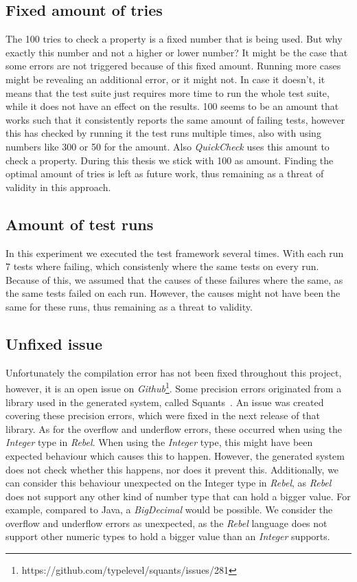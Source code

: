\subsection*{Fixed amount of tries}
The 100 tries to check a property is a fixed number that is being used. But why exactly this number and not a higher or lower number? It might be the case that some errors are not triggered because of this fixed amount. Running more cases might be revealing an additional error, or it might not. In case it doesn't, it means that the test suite just requires more time to run the whole test suite, while it does not have an effect on the results. 100 seems to be an amount that works such that it consistently reports the same amount of failing tests, however this has checked by running it the test runs multiple times, also with using numbers like 300 or 50 for the amount. Also \textit{QuickCheck} uses this amount to check a property. During this thesis we stick with 100 as amount. Finding the optimal amount of tries is left as future work, thus remaining as a threat of validity in this approach.

\subsection*{Amount of test runs}
In this experiment we executed the test framework several times. With each run 7 tests where failing, which consistenly where the same tests on every run. Because of this, we assumed that the causes of these failures where the same, as the same tests failed on each run. However, the causes might not have been the same for these runs, thus remaining as a threat to validity.

\subsection*{Unfixed issue}
Unfortunately the compilation error has not been fixed throughout this project, however, it is an open issue on \textit{Github}\footnote{https://github.com/typelevel/squants/issues/281}. Some precision errors originated from a library used in the generated system, called Squants~\cite{siteSquants2017}. An issue was created covering these precision errors, which were fixed in the next release of that library. As for the overflow and underflow errors, these occurred when using the \textit{Integer} type in \textit{Rebel}. When using the \textit{Integer} type, this might have been expected behaviour which causes this to happen. However, the generated system does not check whether this happens, nor does it prevent this. Additionally, we can consider this behaviour unexpected on the Integer type in
\textit{Rebel}, as \textit{Rebel} does not support any other kind of number type that can hold a bigger value. For example, compared to
Java, a \textit{BigDecimal} would be possible. We consider the overflow and underflow errors as unexpected, as the \textit{Rebel} language does not support other numeric types to hold a bigger value than an \textit{Integer} supports.
